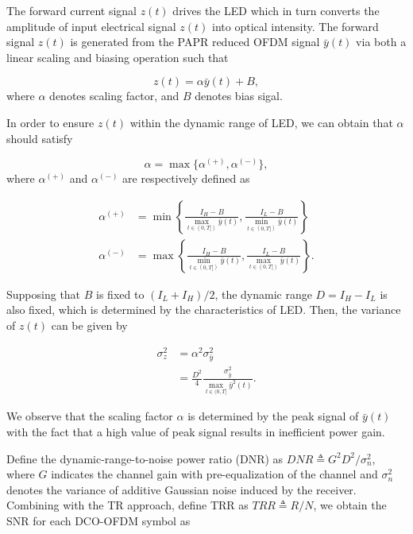 \documentclass[9pt,twocolumn,twoside]{osajnl}
\begin{document}
The forward current signal $z(t)$ drives the LED which in turn converts the amplitude of input electrical signal $z(t)$ into optical intensity. The forward signal $z(t)$ is generated 
from the PAPR reduced OFDM signal $\bar{y}(t)$ via both a linear scaling and biasing operation such that

\begin{equation}
  z(t)=\alpha \bar{y}(t) + B,
\end{equation}
where $\alpha$ denotes scaling factor, and $B$ denotes bias sigal.

In order to ensure $z(t)$ within the dynamic range of LED, we can obtain that $\alpha$ should satisfy

\begin{equation}
  \alpha = \max\{\alpha^{(+)}, \alpha^{(-)}\},
\end{equation}
where $\alpha^{(+)}$ and $\alpha^{(-)}$ are respectively defined as

\begin{align}
  \alpha^{(+)} & = \min \left\{\frac{I_H-B}{\max\limits_{t \in (0,T])}{\bar{y}(t)}}, \frac{I_L-B}{\min\limits_{t \in (0,T])}{\bar{y}(t)}}\right\} \\
  \alpha^{(-)} & = \max \left\{\frac{I_H-B}{\min\limits_{t \in (0,T])}{\bar{y}(t)}}, \frac{I_L-B}{\max\limits_{t \in (0,T])}{\bar{y}(t)}}\right\}.
\end{align}

Supposing that $B$ is fixed to $(I_L+I_H)/2$, the dynamic range $D=I_H-I_L$ is also fixed, which is determined by the characteristics of LED. Then, the variance 
of $z(t)$ can be given by

\begin{align}
  \sigma_z^2 & = \alpha^2 \sigma^2_{\bar{y}} \\
  & = \frac{D^2}{4} \frac{\sigma^2_{\bar{y}}}{\max\limits_{t \in (0,T]}{\bar{y}^2(t)}}.
\end{align}

We observe that the scaling factor $\alpha$ is determined by the peak signal of $\bar{y}(t)$ with the fact that a high 
value of peak signal results in inefficient power gain.

Define the dynamic-range-to-noise power ratio (DNR) as $DNR \triangleq G^2D^2/\sigma_n^2$, where $G$ indicates the channel gain with pre-equalization of the channel 
and $\sigma_n^2$ denotes the variance of additive Gaussian noise induced by the receiver.
Combining with the TR approach, define TRR as $TRR \triangleq R/N$, we obtain the SNR for each DCO-OFDM symbol as
\end{document}
